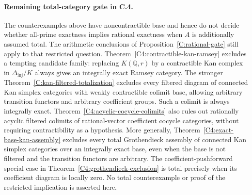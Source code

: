 \paragraph{Remaining total-category gate in C.4.}
The counterexamples above have noncontractible base and hence do not
decide whether all-prime exactness implies rational exactness when
$A$ is additionally assumed total. The arithmetic conclusions of
Proposition~\ref{C:rational-gate} still apply to that restricted
question. Theorem~\ref{C4:contractible-kan-ramsey} excludes a tempting
candidate family: replacing $K(\mathbb Q,r)$ by a contractible Kan
complex in $\Delta_{\mathrm{inj}}/K$ always gives an integrally exact
Ramsey category. The stronger
Theorem~\ref{C:kan-filtered-totalization} excludes every filtered
diagram of connected Kan simplex categories with weakly contractible
colimit base, allowing arbitrary transition functors and arbitrary
coefficient groups. Such a colimit is always integrally exact.
Theorem~\ref{C4:acyclic-cocycle-colimits} also rules out rationally
acyclic filtered colimits of rational-vector coefficient cocycle
categories, without requiring contractibility as a hypothesis.
More generally, Theorem~\ref{C4:exact-base-kan-assembly} excludes
every total Grothendieck assembly of connected Kan simplex
categories over an integrally exact base, even when the base is
not filtered and the transition functors are arbitrary.
The coefficient-pushforward special case in
Theorem~\ref{C4:grothendieck-exclusion} is total precisely when
its coefficient diagram is locally zero.
No total counterexample or proof of the restricted implication is
asserted here.

